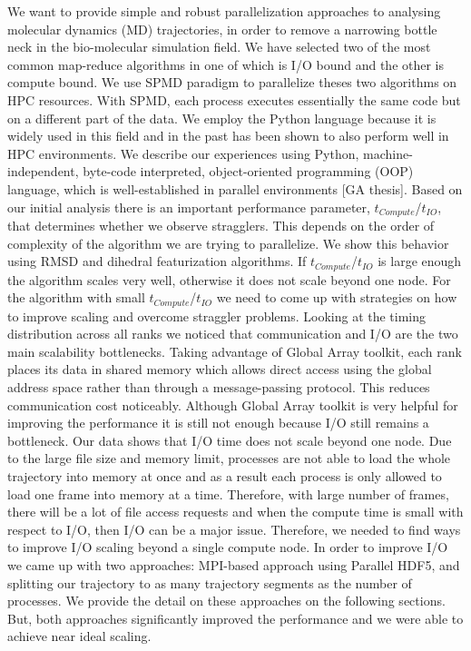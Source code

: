 We want to provide simple and robust parallelization approaches to analysing molecular dynamics (MD) trajectories, in order to remove a narrowing bottle neck in the bio-molecular simulation field. 
We have selected two of the most common map-reduce algorithms in  one of which is I/O bound and the other is compute bound.
We use SPMD paradigm to parallelize theses two algorithms on HPC resources.
With SPMD, each process executes essentially the same code but on a different part of the data. 
We employ the Python language because it is widely used in this field and in the past has been shown to also perform well in HPC environments.
We describe our experiences using Python, machine-independent, byte-code interpreted, object-oriented programming (OOP) language, which is well-established in parallel environments [GA thesis]. 
Based on our initial analysis there is an important performance parameter,  $t_{Compute}$/$t_{IO}$, that determines whether we observe stragglers.
This depends on the order of complexity of the algorithm we are trying to parallelize.
We show this behavior using RMSD and dihedral featurization algorithms.
If $t_{Compute}$/$t_{IO}$ is large enough the algorithm scales very well, otherwise it does not scale beyond one node. 
For the algorithm with small $t_{Compute}$/$t_{IO}$ we need to come up with strategies on how to improve scaling and overcome straggler problems.
Looking at the timing distribution across all ranks we noticed that communication and I/O are the two main scalability bottlenecks.
Taking advantage of Global Array toolkit, each rank places its data in shared memory which allows direct access using the global address space rather than through a message-passing protocol. 
This reduces communication cost noticeably.
Although Global Array toolkit is very helpful for improving the performance it is still not enough because I/O still remains a bottleneck.
Our data shows that I/O time does not scale beyond one node. 
Due to the large file size and memory limit, processes are not able to load the whole trajectory into memory at once and as a result each process is only allowed to load one frame into memory at a time.
Therefore, with large number of frames, there will be a lot of file access requests and when the compute time is small with respect to I/O, then I/O can be a major issue.
Therefore, we needed to find ways to improve I/O scaling beyond a single compute node.
In order to improve I/O we came up with two approaches: MPI-based approach using Parallel HDF5, and splitting our trajectory to as many trajectory segments as the number of processes. 
We provide the detail on these approaches on the following sections.
But, both approaches significantly improved the performance and we were able to achieve near ideal scaling.